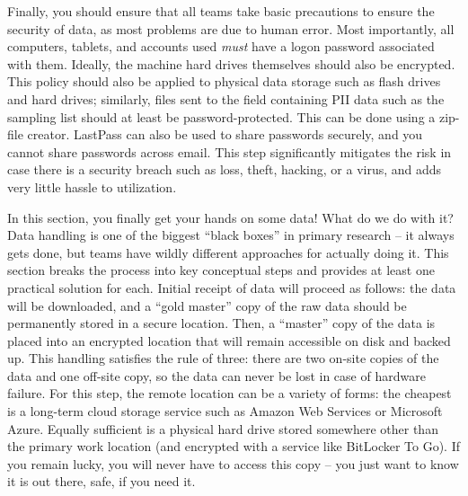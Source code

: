 Finally, you should ensure that all teams take basic precautions
to ensure the security of data, as most problems are due to human error.
Most importantly, all computers, tablets, and accounts used
\textit{must} have a logon password associated with them.
Ideally, the machine hard drives themselves should also be encrypted.
This policy should also be applied to physical data storage
such as flash drives and hard drives;
similarly, files sent to the field containing PII data
such as the sampling list should at least be password-protected.
This can be done using a zip-file creator.
LastPass can also be used to share passwords securely,
and you cannot share passwords across email.
This step significantly mitigates the risk in case there is
a security breach such as loss, theft, hacking, or a virus,
and adds very little hassle to utilization.


In this section, you finally get your hands on some data!
What do we do with it? Data handling is one of the biggest
``black boxes'' in primary research -- it always gets done,
but teams have wildly different approaches for actually doing it.
This section breaks the process into key conceptual steps
and provides at least one practical solution for each.
Initial receipt of data will proceed as follows:
the data will be downloaded, and a ``gold master'' copy
of the raw data should be permanently stored in a secure location.
Then, a ``master'' copy of the data is placed into an encrypted location
that will remain accessible on disk and backed up.
This handling satisfies the rule of three:
there are two on-site copies of the data and one off-site copy,
so the data can never be lost in case of hardware failure.
For this step, the remote location can be a variety of forms:
the cheapest is a long-term cloud storage service
such as Amazon Web Services or Microsoft Azure.
Equally sufficient is a physical hard drive
stored somewhere other than the primary work location
(and encrypted with a service like BitLocker To Go).
If you remain lucky, you will never have to access this copy --
you just want to know it is out there, safe, if you need it.

